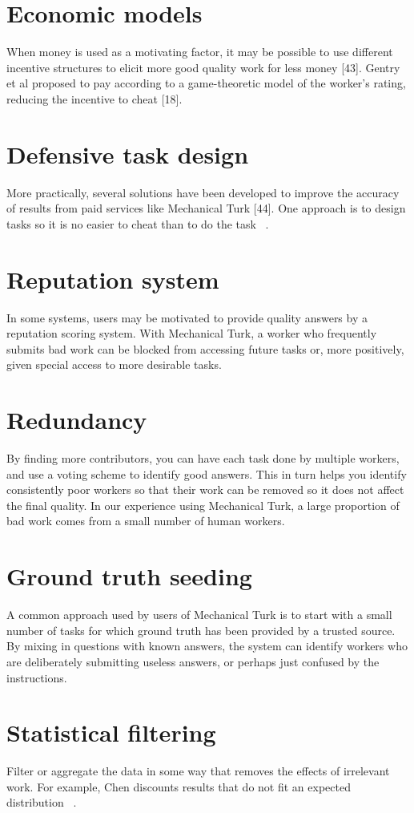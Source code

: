 \documentclass{acm_proc_article-sp}
\begin{document}
\section*{Economic models}
When money is used as a motivating factor, it may be possible to use different incentive structures to elicit more good quality work for less money [43]. Gentry et al proposed to pay according to a game-theoretic model of the worker's rating, reducing the incentive to cheat [18].
\section*{Defensive task design}
More practically, several solutions have been developed to improve the accuracy of results from paid services like Mechanical Turk [44]. One approach is to design tasks so it is no easier to cheat than to do the task ~\cite{callison2010}.
\section*{Reputation system}
In some systems, users may be motivated to provide quality answers by a reputation scoring system. With Mechanical Turk, a worker who frequently submits bad work can be blocked from accessing future tasks or, more positively, given special access to more desirable tasks.
\section*{Redundancy}
By finding more contributors, you can have each task done by multiple workers, and use a voting scheme to identify good answers. This in turn helps you identify consistently poor workers so that their work can be removed so it does not affect the final quality. In our experience using Mechanical Turk, a large proportion of bad work comes from a small number of human workers.
\section*{Ground truth seeding}
A common approach used by users of Mechanical Turk is to start with a small number of tasks for which ground truth has been provided by a trusted source. By mixing in questions with known answers, the system can identify workers who are deliberately submitting useless answers, or perhaps just confused by the instructions.
\section*{Statistical filtering}
Filter or aggregate the data in some way that removes the effects of irrelevant work. For example, Chen discounts results that do not fit an expected distribution ~\cite{chen2009}.
\end{document}
